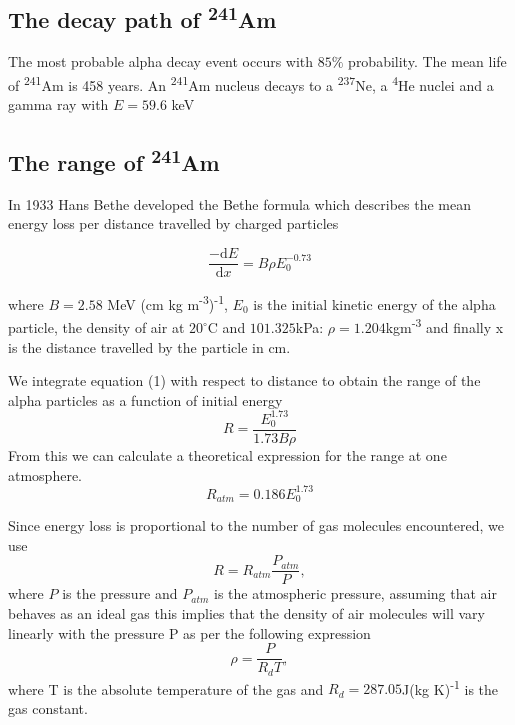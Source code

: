\documentclass[a4paper]{article}
\begin{document}
\begin{multicols}{2}
\subsection{The decay path of \textsuperscript{241}Am}
The most probable alpha decay event occurs with $85\%$ probability.
The mean life of \textsuperscript{241}Am is 458 years.\cite{SPA}
An \textsuperscript{241}Am nucleus decays to a \textsuperscript{237}Ne, a \textsuperscript{4}He nuclei and a gamma ray with $E = 59.6$ keV\cite{americium}
\subsection{The range of \textsuperscript{241}Am}
In 1933 Hans Bethe developed the Bethe formula which describes the mean energy loss per distance travelled by charged particles\cite{Bethe}

\begin{equation} \frac{-\mathrm{d} E}{\mathrm{d} x} = B \rho E_0^{- 0.73}
\end{equation}

where $B = 2.58$ MeV (cm kg m\textsuperscript{-3})\textsuperscript{-1}, $E_0$ is the initial kinetic energy of the alpha particle, the density of air at $20^{\circ}$C and $101.325$kPa: $\rho = 1.204$kgm\textsuperscript{-3} and finally x is the distance travelled by the particle in cm.

We integrate equation (1) with respect to distance to obtain the range of the alpha particles as a function of initial energy
\begin{equation} R = \frac{E_0^{1.73}}{1.73 B \rho}
\end{equation}
From this we can calculate a theoretical expression for the range at one atmosphere.\cite{SPA}
\begin{equation} R_{atm} = 0.186 E_0^{1.73}
\end{equation}

Since energy loss is proportional to the number of gas molecules encountered\cite{SPA}, we use 
\begin{equation} R = R_{atm} \frac{P_{atm}}{P},
\end{equation}
where $P$ is the pressure and $P_{atm}$ is the atmospheric pressure, assuming that air behaves as an ideal gas this implies that the density of air molecules will vary linearly with the pressure P \cite{SPA} as per the following expression
\begin{equation} \rho = \frac{P}{R_d T},
\end{equation}
where T is the absolute temperature of the gas and $R_d = 287.05$J(kg K)\textsuperscript{-1}  is the gas constant.


\end{multicols}
\end{document}
